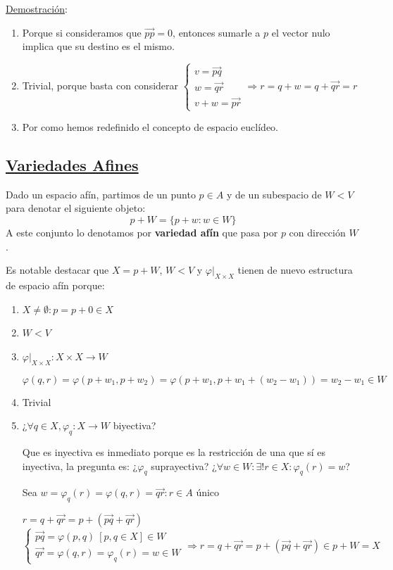 \documentclass[10pt,a4paper,openright]{book}
\begin{document}
\underline{Demostración}:
\begin{enumerate}
\item Porque si consideramos que $\vec{pp}= 0$, entonces sumarle a $p$ el vector nulo implica que su destino es el mismo.

\item Trivial, porque basta con considerar $\begin{cases} v = \vec{pq} \\ w = \vec{qr} \\ v + w = \vec{pr} \end{cases} \Rightarrow r = q + w = q + \vec{qr} = r$

\item Por como hemos redefinido el concepto de espacio euclídeo.
\end{enumerate}

\subsection*{\underline{Variedades Afines}}
Dado un espacio afín, partimos de un punto $p \in A$ y de un subespacio de $W < V$ para denotar el siguiente objeto:
$$p + W = \{p + w : w \in W\}$$
A este conjunto lo denotamos por \textbf{variedad afín} que pasa por $p$ con dirección $W$.

Es notable destacar que $X = p + W$, $W<V$ y $\varphi|_{X \times X}$ tienen de nuevo estructura de espacio afín porque:
\begin{enumerate}
\item $X \neq\emptyset : p = p + 0 \in X $

\item $W < V$

\item $\varphi|_{X \times X} : X \times X \to W$

$$\varphi(q,r) = \varphi (p + w_1, p + w_2) = \varphi(p + w_1, p + w_1 + (w_2 - w_1)) = w_2 - w_1 \in W$$

\item Trivial

\item ¿$\forall q\in X, \varphi_q : X \to W $ biyectiva?

Que es inyectiva es inmediato porque es la restricción de una que sí es inyectiva, la pregunta es: ¿$ \varphi_q $ suprayectiva? ¿$\forall w \in W : \exists! r \in X: \varphi_q (r) = w$?

Sea $w =  \varphi_q (r)=\varphi(q,r) = \vec{qr} : r \in A$ único

$r= q + \vec{qr} = p + (\vec{pq} + \vec{qr})$
$$\begin{cases} \vec{pq} = \varphi(p,q) \ [p,q \in X] \in W \\ \vec{qr} = \varphi(q,r) = \varphi_q(r) = w \in W\end{cases} \Rightarrow r= q + \vec{qr} = p + (\vec{pq} + \vec{qr}) \in p + W = X$$
\end{enumerate}
\end{document}
